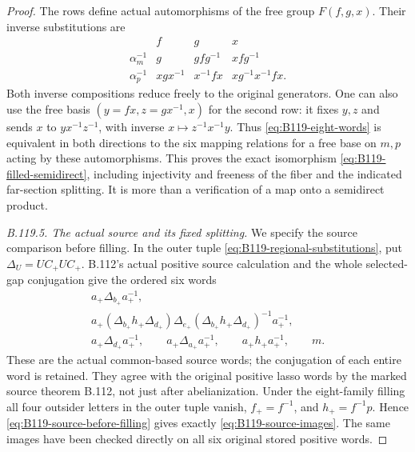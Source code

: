 \begin{proof}
The rows define actual automorphisms of the free group $F(f,g,x)$.
Their inverse substitutions are
\begin{equation}\label{eq:B119-base-inverses}
 \begin{array}{c|ccc}
       &f&g&x\\ \hline
 \alpha_m^{-1}&g&gfg^{-1}&xfg^{-1}\\
 \alpha_p^{-1}&xgx^{-1}&x^{-1}fx&xg^{-1}x^{-1}fx.
 \end{array}
\end{equation}
Both inverse compositions reduce freely to the original generators.
One can also use the free basis $(y=fx,z=gx^{-1},x)$ for the
second row: it fixes $y,z$ and sends $x$ to $yx^{-1}z^{-1}$,
with inverse $x\mapsto z^{-1}x^{-1}y$.
Thus \eqref{eq:B119-eight-words} is equivalent in both directions
to the six mapping relations for a free base on $m,p$ acting by
these automorphisms. This proves the exact isomorphism
\eqref{eq:B119-filled-semidirect}, including injectivity and freeness
of the fiber and the indicated far-section splitting. It is more
than a verification of a map onto a semidirect product.

\emph{B.119.5. The actual source and its fixed splitting.}
We specify the source comparison before filling. In the outer tuple
\eqref{eq:B119-regional-substitutions}, put
$\Delta_U=UC_+UC_+$. B.112's actual positive source calculation
and the whole selected-gap conjugation give the ordered six words
\begin{equation}\label{eq:B119-source-before-filling}
 \begin{gathered}
 a_+\Delta_{b_+}a_+^{-1},\\
 a_+(\Delta_{b_+}h_+\Delta_{d_+})\Delta_{e_+}
       (\Delta_{b_+}h_+\Delta_{d_+})^{-1}a_+^{-1},\\
 a_+\Delta_{d_+}a_+^{-1},\qquad
 a_+\Delta_{a_+}a_+^{-1},\qquad
 a_+h_+a_+^{-1},\qquad m.
 \end{gathered}
\end{equation}
These are the actual common-based source words; the conjugation of
each entire word is retained. They agree with the original positive
lasso words by the marked source theorem B.112, not just after
abelianization. Under the eight-family filling all four outsider
letters in the outer tuple vanish, $f_+=f^{-1}$, and
$h_+=f^{-1}p$. Hence \eqref{eq:B119-source-before-filling} gives
exactly \eqref{eq:B119-source-images}. The same images have been
checked directly on all six original stored positive words.


\end{proof}
